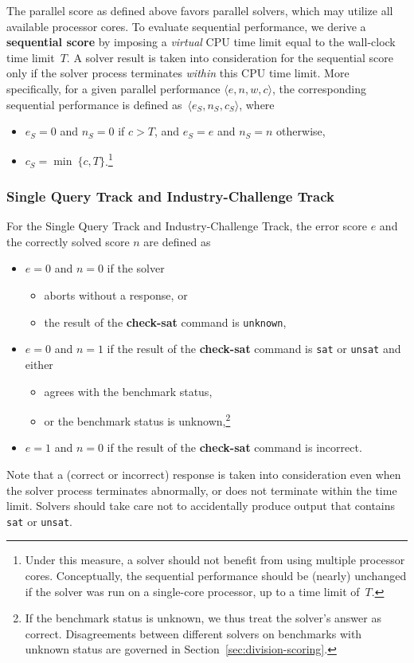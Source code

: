 \documentclass[12pt]{article}
\newcommand{\akey}[1]{\textbf{#1}\xspace}
\newcommand{\maintrack}{Single Query Track\xspace}
\newcommand{\challtrack}{Industry-Challenge Track\xspace}
\begin{document}
The parallel score as defined above favors parallel solvers, which may utilize
all available processor cores.  To evaluate sequential performance, we derive a
\textbf{sequential score} by imposing a \emph{virtual} CPU time limit equal to
the wall-clock time limit~$T$.  A solver result is taken into consideration for
the sequential score only if the solver process terminates \emph{within} this
CPU time limit.  More specifically, for a given parallel performance $\langle
e, n, w, c\rangle$, the corresponding sequential performance is defined
as~$\langle e_S, n_S, c_S\rangle$, where
\begin{itemize}
\item $e_S = 0$ and $n_S = 0$ if $c > T$, and $e_S = e$ and $n_S = n$
  otherwise,
\item $c_S = \min\ \{c, T\}$.\footnote{Under this
  measure, a solver should not benefit from using multiple processor
  cores.  Conceptually, the sequential performance should be (nearly)
  unchanged if the solver was run on a single-core processor, up to a
  time limit of~$T$.}
\end{itemize}

\subsubsection{\maintrack and \challtrack}
  For the \maintrack and \challtrack, the error score $e$ and the correctly
  solved score $n$ are defined as
  \begin{itemize}
  \item $e=0$ and $n=0$ if the solver
    \begin{itemize}[noitemsep,nolistsep]
      \item aborts without a response, or
      \item  the result of the \akey{check-sat} command is \texttt{unknown},
    \end{itemize}
  \item $e=0$ and $n=1$ if the result of the \akey{check-sat} command is
      \texttt{sat} or \texttt{unsat} and either
    \begin{itemize}[noitemsep,nolistsep]
      \item agrees with the benchmark status,
      \item or the benchmark status
        is unknown,\footnote{If the benchmark status is unknown, we thus treat
        the solver's answer as correct.  Disagreements between different
        solvers on benchmarks with unknown status are governed in
        Section~\ref{sec:division-scoring}.}
    \end{itemize}
  \item $e=1$ and $n=0$ if the result of the \akey{check-sat} command is
    incorrect.
  \end{itemize}
%
Note that a (correct or incorrect) response is taken into
consideration even when the solver process terminates abnormally, or
does not terminate within the time limit.  Solvers should take care
not to accidentally produce output that contains \texttt{sat} or
\texttt{unsat}.
\end{document}
